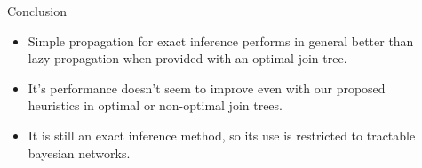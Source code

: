 \documentclass[final]{beamer}
\newlength{\sepwid}
\newlength{\onecolwid}
\newlength{\twocolwid}
\begin{document}
\begin{frame}[t]
\begin{columns}[t]
\begin{column}{\twocolwid}
\begin{columns}[t,totalwidth=\twocolwid]
\begin{column}{\onecolwid}
\end{column} %

\end{columns} %





\begin{columns}[t,totalwidth=\twocolwid] %


\end{columns} %

\end{column} %

\begin{column}{\sepwid}\end{column} %

\begin{column}{\onecolwid} %


\begin{block}{Conclusion}

\begin{itemize}
\item Simple propagation for exact inference performs in general better than lazy propagation when provided with an optimal join tree.
\item It's performance doesn't seem to improve even with our proposed heuristics in optimal or non-optimal join trees. 
\item It is still an exact inference method, so its use is restricted to tractable bayesian networks.
\end{itemize}
 

\end{block}



\end{column}
\end{columns}
\end{frame}
\end{document}
